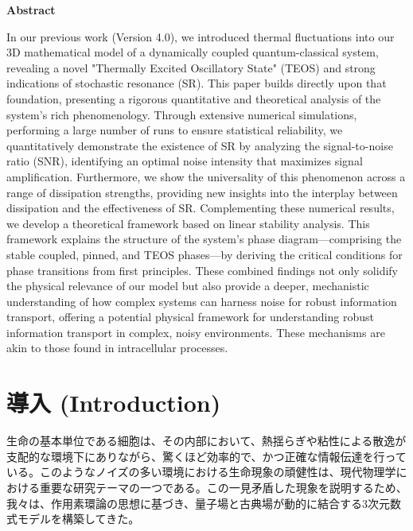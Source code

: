 \documentclass[a4paper,11pt,ja=standard,lualatex]{bxjsarticle}
\begin{document}
\vspace{1em}
\noindent\textbf{Abstract}
\par\noindent
\small
In our previous work (Version 4.0), we introduced thermal fluctuations into our 3D mathematical model of a dynamically coupled quantum-classical system, revealing a novel "Thermally Excited Oscillatory State" (TEOS) and strong indications of stochastic resonance (SR). This paper builds directly upon that foundation, presenting a rigorous quantitative and theoretical analysis of the system's rich phenomenology. Through extensive numerical simulations, performing a large number of runs to ensure statistical reliability, we quantitatively demonstrate the existence of SR by analyzing the signal-to-noise ratio (SNR), identifying an optimal noise intensity that maximizes signal amplification. Furthermore, we show the universality of this phenomenon across a range of dissipation strengths, providing new insights into the interplay between dissipation and the effectiveness of SR. Complementing these numerical results, we develop a theoretical framework based on linear stability analysis. This framework explains the structure of the system's phase diagram—comprising the stable coupled, pinned, and TEOS phases—by deriving the critical conditions for phase transitions from first principles. These combined findings not only solidify the physical relevance of our model but also provide a deeper, mechanistic understanding of how complex systems can harness noise for robust information transport, offering a potential physical framework for understanding robust information transport in complex, noisy environments. These mechanisms are akin to those found in intracellular processes.
\normalsize
\vspace{2em}

\FloatBarrier
\section{導入 (Introduction)}
生命の基本単位である細胞は、その内部において、熱揺らぎや粘性による散逸が支配的な環境下にありながら、驚くほど効率的で、かつ正確な情報伝達を行っている。このようなノイズの多い環境における生命現象の頑健性は、現代物理学における重要な研究テーマの一つである\cite{lindner}。この一見矛盾した現象を説明するため、我々は、作用素環論\cite{vonneumann, bratteli}の思想に基づき、量子場と古典場が動的に結合する3次元数式モデルを構築してきた。
\end{document}
